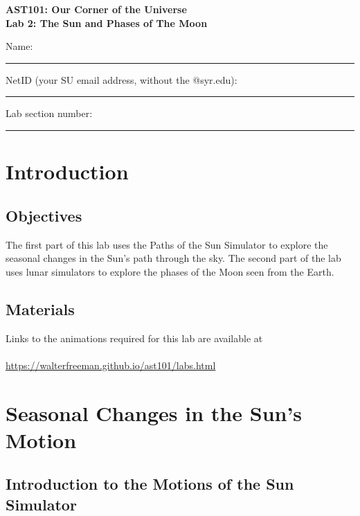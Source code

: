 \documentclass[11pt]{article}
\begin{document}
\begin{center}
\textbf{\Large
AST101: Our Corner of the Universe \\
\vspace*{0.1cm}
Lab 2: The Sun and Phases of The Moon
}
\end{center}

\vspace*{0.5cm}

{\Large Name:}\vspace*{0.5cm}\\\hrule
{\Large NetID (your SU email address, without the @syr.edu):}\vspace*{0.5cm}\\\hrule
{\Large Lab section number:}\vspace*{0.5cm}\\\hrule
\vspace*{0.5cm}

\section{Introduction}

\subsection*{Objectives} 

The first part of this lab uses the Paths of the Sun Simulator to explore the
seasonal changes in the Sun's path through the sky. The second part of the lab
uses lunar simulators to explore the phases of the Moon seen from the Earth.

\subsection*{Materials}

Links to the animations required for this lab are available at \\
\\
\url{https://walterfreeman.github.io/ast101/labs.html}

\section{Seasonal Changes in the Sun's Motion}

\subsection{Introduction to the Motions of the Sun Simulator}
\end{document}

